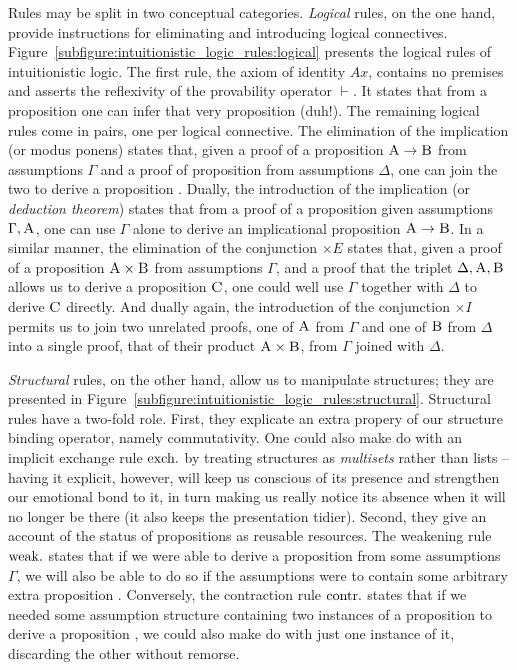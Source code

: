 Rules may be split in two conceptual categories.
\textit{Logical} rules, on the one hand, provide instructions for eliminating and introducing logical connectives.
Figure~\ref{subfigure:intuitionistic_logic_rules:logical} presents the logical rules of intuitionistic logic.
The first rule, the axiom of identity $Ax$, contains no premises and asserts the reflexivity of the provability operator $\vdash$. 
It states that from a proposition  one can infer that very proposition (duh!).
The remaining logical rules come in pairs, one per logical connective.
The elimination of the implication (or modus ponens) states that, given a proof of a proposition $\prop A \to \prop B$ from assumptions $\Gamma$ and a proof of proposition  from assumptions $\Delta$, one can join the two to derive a proposition .
Dually, the introduction of the implication (or \textit{deduction theorem}) states that from a proof of a proposition  given assumptions $\Gamma, \prop{A}$, one can use $\Gamma$ alone to derive an implicational proposition $\prop A \to \prop B$.
In a similar manner, the elimination of the conjunction $\times E $ states that, given a proof of a proposition $\prop A \times \prop B$ from assumptions $\Gamma$, and a proof that the triplet $\Delta, \prop A, \prop B$ allows us to derive a proposition $\prop C$, one could well use $\Gamma$ together with $\Delta$ to derive $\prop C$ directly.
And dually again, the introduction of the conjunction $\times I$ permits us to join two unrelated proofs, one of $\prop A$ from $\Gamma$ and one of $\prop B$ from $\Delta$ into a single proof, that of their product $\prop A \times \prop B$, from $\Gamma$ joined with $\Delta$.

\textit{Structural} rules, on the other hand, allow us to manipulate structures; they are presented in Figure~\ref{subfigure:intuitionistic_logic_rules:structural}.
Structural rules have a two-fold role.
First, they explicate an extra propery of our structure binding operator, namely commutativity.
One could also make do with an implicit exchange rule $\mathrm{exch.}{}$ by treating structures as \textit{multisets} rather than lists -- having it explicit, however, will keep us conscious of its presence and strengthen our emotional bond to it, in turn making us really notice its absence when it will no longer be there (it also keeps the presentation tidier).
Second, they give an account of the status of propositions as reusable resources.
The weakening rule $\mathrm{weak.}{}$ states that if we were able to derive a proposition  from some assumptions $\Gamma$, we will also be able to do so if the assumptions were to contain some arbitrary extra proposition .
Conversely, the contraction rule $\mathrm{contr.}{}$ states that if we needed some assumption structure containing two instances of a proposition  to derive a proposition , we could also make do with just one instance of it, discarding the other without remorse.

